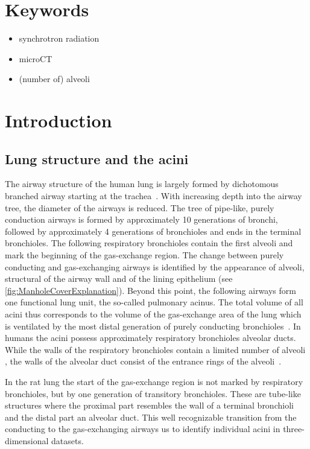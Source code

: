 \documentclass[final,paper=a4,DIV=calc,abstract,english]{scrartcl}
\begin{document}
\section*{Keywords}
\begin{itemize}
	\item synchrotron radiation 
	\item microCT
	\item (number of) alveoli
\end{itemize}

\section{Introduction}
\subsection{Lung structure and the acini}
The airway structure of the human lung is largely formed by dichotomous branched airway starting at the trachea~\citep{Weibel1991}.
With increasing depth into the airway tree, the diameter of the airways is reduced.
The tree of pipe-like, purely conduction airways is formed by approximately 10 generations of bronchi, followed by approximately 4 generations of bronchioles and ends in the terminal bronchioles.
The following respiratory bronchioles contain the first alveoli and mark the beginning of the gas-exchange region.
The change between purely conducting and gas-exchanging airways is identified by the appearance of alveoli, structural  of the airway wall and of the lining epithelium (see \autoref{fig:ManholeCoverExplanation}).
Beyond this point, the following airways form one functional lung unit, the so-called pulmonary acinus.
The total volume of all acini thus corresponds to the volume of the gas-exchange area of the lung which is ventilated by the most distal generation of purely conducting bronchioles~\citep{Rodriguez1987}.
In humans the acini possess approximately  respiratory bronchioles  alveolar ducts.
While the walls of the respiratory bronchioles contain a limited number of alveoli , the walls of the alveolar duct  consist of the entrance rings of the alveoli~\citep{Schittny2007}.

In the rat lung the start of the gas-exchange region is not marked by respiratory bronchioles, but by one generation of transitory bronchioles.
These are tube-like structures where the proximal part resembles the wall of a terminal bronchioli and the distal part an alveolar duct.
This well recognizable transition from the conducting to the gas-exchanging airways  us to identify individual acini in three-dimensional datasets.
\end{document}
